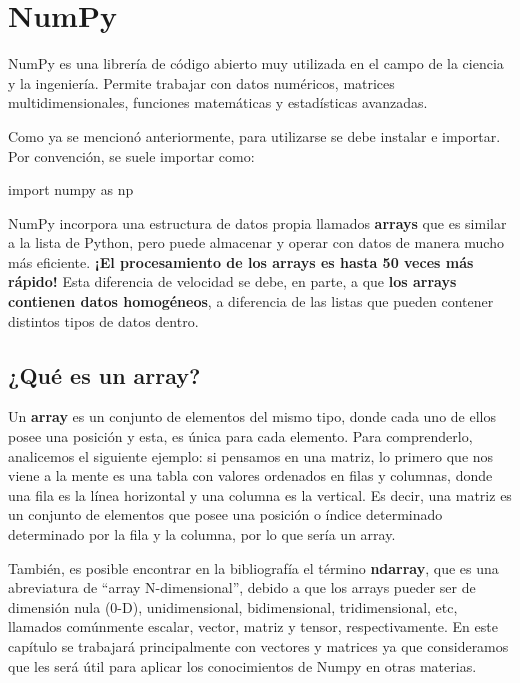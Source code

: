 \documentclass[
  letterpaper,
  DIV=11,
  numbers=noendperiod]{scrreprt}
\newenvironment{Shaded}{\begin{snugshade}}{\end{snugshade}}
\newcommand{\ImportTok}[1]{\textcolor[rgb]{0.00,0.46,0.62}{#1}}
\newcommand{\NormalTok}[1]{\textcolor[rgb]{0.00,0.23,0.31}{#1}}
\begin{document}
\section{NumPy}\label{numpy}

NumPy es una librería de código abierto muy utilizada en el campo de la
ciencia y la ingeniería. Permite trabajar con datos numéricos, matrices
multidimensionales, funciones matemáticas y estadísticas avanzadas.

Como ya se mencionó anteriormente, para utilizarse se debe instalar e
importar. Por convención, se suele importar como:

\begin{Shaded}
\begin{Highlighting}[]
\ImportTok{import}\NormalTok{ numpy }\ImportTok{as}\NormalTok{ np}
\end{Highlighting}
\end{Shaded}

NumPy incorpora una estructura de datos propia llamados \textbf{arrays}
que es similar a la lista de Python, pero puede almacenar y operar con
datos de manera mucho más eficiente. \textbf{¡El procesamiento de los
arrays es hasta 50 veces más rápido!} Esta diferencia de velocidad se
debe, en parte, a que \textbf{los arrays contienen datos homogéneos}, a
diferencia de las listas que pueden contener distintos tipos de datos
dentro.

\subsection{\texorpdfstring{¿Qué es un
\textbf{array}?}{¿Qué es un array?}}\label{quuxe9-es-un-array}

Un \textbf{array} es un conjunto de elementos del mismo tipo, donde cada
uno de ellos posee una posición y esta, es única para cada elemento.
Para comprenderlo, analicemos el siguiente ejemplo: si pensamos en una
matriz, lo primero que nos viene a la mente es una tabla con valores
ordenados en filas y columnas, donde una fila es la línea horizontal y
una columna es la vertical. Es decir, una matriz es un conjunto de
elementos que posee una posición o índice determinado determinado por la
fila y la columna, por lo que sería un array.

También, es posible encontrar en la bibliografía el término
\textbf{ndarray}, que es una abreviatura de ``array N-dimensional'',
debido a que los arrays pueder ser de dimensión nula (0-D),
unidimensional, bidimensional, tridimensional, etc, llamados comúnmente
escalar, vector, matriz y tensor, respectivamente. En este capítulo se
trabajará principalmente con vectores y matrices ya que consideramos que
les será útil para aplicar los conocimientos de Numpy en otras materias.
\end{document}

